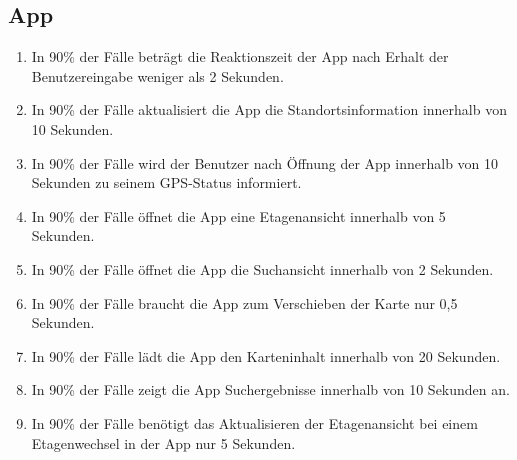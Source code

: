 \subsection{App}

\begin{enumerate}
    \item In 90\% der Fälle beträgt die \Gls{Reaktionszeit} der App nach Erhalt der \Gls{Benutzereingabe} weniger als 2 Sekunden.
    \item In 90\% der Fälle aktualisiert die App die Standortsinformation innerhalb von 10 Sekunden.
    \item In 90\% der Fälle wird der \Gls{Benutzer} nach Öffnung der App innerhalb von 10 Sekunden zu seinem \Gls{GPS}-Status informiert.
    \item In 90\% der Fälle öffnet die App eine \Gls{Etagenansicht} innerhalb von 5 Sekunden.
    \item In 90\% der Fälle öffnet die App die \Gls{Suchansicht} innerhalb von 2 Sekunden.
    \item In 90\% der Fälle braucht die App zum Verschieben der \Gls{Karte} nur 0,5 Sekunden.
    \item In 90\% der Fälle lädt die App den Karteninhalt innerhalb von 20 Sekunden.
    \item In 90\% der Fälle zeigt die App Suchergebnisse innerhalb von 10 Sekunden an.
    \item In 90\% der Fälle benötigt das Aktualisieren der \Gls{Etagenansicht} bei einem \Gls{Etagenwechsel} in der App nur 5 Sekunden.
\end{enumerate}